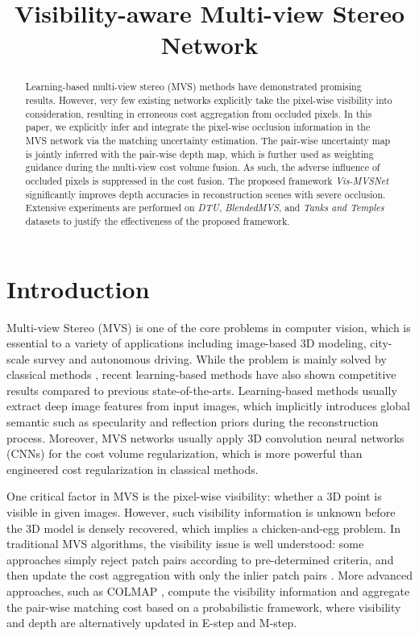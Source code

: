 \documentclass{bmvc2k}
\title{Visibility-aware Multi-view Stereo Network}
\begin{document}
\maketitle

\begin{abstract}
	Learning-based multi-view stereo (MVS) methods have demonstrated promising results. However, very few existing networks explicitly take the pixel-wise visibility into consideration, resulting in erroneous cost aggregation from occluded pixels. In this paper, we explicitly infer and integrate the pixel-wise occlusion information in the MVS network via the matching uncertainty estimation. The pair-wise uncertainty map is jointly inferred with the pair-wise depth map, which is further used as weighting guidance during the multi-view cost volume fusion. As such, the adverse influence of occluded pixels is suppressed in the cost fusion. The proposed framework \textit{Vis-MVSNet} significantly improves depth accuracies in reconstruction scenes with severe occlusion. Extensive experiments are performed on \textit{DTU}, \textit{BlendedMVS}, and \textit{Tanks and Temples} datasets to justify the effectiveness of the proposed framework. 
\end{abstract}

\section{Introduction}
Multi-view Stereo (MVS) is one of the core problems in computer vision, which is essential to a variety of applications including image-based 3D modeling, city-scale survey and autonomous driving. While the problem is mainly solved by classical methods \cite{campbell2008using, furukawa2009accurate, tola2012efficient, galliani2015massively, schonberger2016pixelwise}, recent learning-based methods \cite{yao2018mvsnet,yao2019recurrent,gu2020cascade} have also shown competitive results compared to previous state-of-the-arts. Learning-based methods usually extract deep image features from input images, which implicitly introduces global semantic such as specularity and reflection priors during the reconstruction process. Moreover, MVS networks usually apply 3D convolution neural networks (CNNs) for the cost volume regularization, which is more powerful than engineered cost regularization in classical methods.

One critical factor in MVS is the pixel-wise visibility: whether a 3D point is visible in given images. However, such visibility information is unknown before the 3D model is densely recovered, which implies a chicken-and-egg problem. In traditional MVS algorithms, the visibility issue is well understood: some approaches simply reject patch pairs according to pre-determined criteria, and then update the cost aggregation with only the inlier patch pairs \cite{furukawa2009accurate,tola2012efficient,xu2019multi}. More advanced approaches, such as COLMAP \cite{zheng2014patchmatch,schonberger2016pixelwise}, compute the visibility information and aggregate the pair-wise matching cost based on a probabilistic framework, where visibility and depth are alternatively updated in E-step and M-step. 
\end{document}
